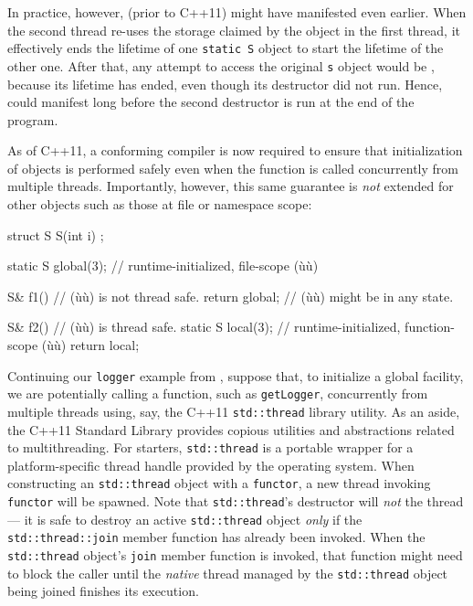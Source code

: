 In practice, however,  (prior to C++11) might
have manifested even earlier. When the second thread re-uses the storage
claimed by the object in the first thread, it effectively ends the
lifetime of one \lstinline!static!~\lstinline!S! object to start the lifetime
of the other one. After that, any attempt to access the original
\lstinline!s! object would be , because its
lifetime has ended, even though its destructor did not run. Hence,
 could manifest long before the second
destructor is run at the end of the program.

As of C++11, a conforming compiler is now required to ensure that
initialization of  
objects is performed safely even when the function is called
concurrently from multiple threads. Importantly, however, this same
guarantee is \emph{not} extended for other 
objects such as those at file or namespace scope:

\begin{emcppshiddenlisting}[emcppsbatch=e5]
struct S {
    S(int i) {}
};
\end{emcppshiddenlisting}
\begin{emcppslisting}[emcppsbatch=e5]
static S global(3);         // runtime-initialized, file-scope (ù{}ù)

S& f1()                     // (ù{}ù) is not thread safe.
{
    return global;          // (ù{}ù) might be in any state.
}

S& f2()                     // (ù{}ù) is thread safe.
{
    static S local(3);      // runtime-initialized, function-scope (ù{}ù)
    return local;
}
\end{emcppslisting}

\noindent Continuing our \lstinline!logger! example from , suppose that, to initialize a global
facility, we are potentially calling a function, such as
\lstinline!getLogger!, concurrently from multiple threads using, say, the
C++11 \lstinline!std::thread! library utility. As an aside, the C++11
Standard Library provides copious utilities and abstractions related
to multithreading. For starters, \lstinline!std::thread! is a portable
wrapper for a platform-specific thread handle provided by the
operating system. When constructing an \lstinline!std::thread! object
with a  \lstinline!functor!, a new thread
invoking \lstinline!functor! will be spawned. Note that
\lstinline!std::thread!'s destructor will \emph{not}  the
thread --- it is safe to destroy an active \lstinline!std::thread! object
\emph{only} if the \lstinline!std::thread::join! member function has
already been invoked. When the \lstinline!std::thread! object's
\lstinline!join! member function is invoked, that function might need to
block the caller until the \emph{native} thread managed by the
  \lstinline!std::thread! object being joined finishes its execution.

